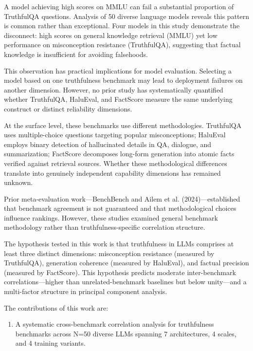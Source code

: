 
A model achieving high scores on MMLU can fail a substantial proportion of TruthfulQA questions. Analysis of 50 diverse language models reveals this pattern is common rather than exceptional. Four models in this study demonstrate the disconnect: high scores on general knowledge retrieval (MMLU) yet low performance on misconception resistance (TruthfulQA), suggesting that factual knowledge is insufficient for avoiding falsehoods.

This observation has practical implications for model evaluation. Selecting a model based on one truthfulness benchmark may lead to deployment failures on another dimension. However, no prior study has systematically quantified whether TruthfulQA, HaluEval, and FactScore measure the same underlying construct or distinct reliability dimensions.

At the surface level, these benchmarks use different methodologies. TruthfulQA uses multiple-choice questions targeting popular misconceptions; HaluEval employs binary detection of hallucinated details in QA, dialogue, and summarization; FactScore decomposes long-form generation into atomic facts verified against retrieval sources. Whether these methodological differences translate into genuinely independent capability dimensions has remained unknown.

Prior meta-evaluation work---BenchBench \citep{perlitz2024benchbench} and Ailem et al. (2024)---established that benchmark agreement is not guaranteed and that methodological choices influence rankings. However, these studies examined general benchmark methodology rather than truthfulness-specific correlation structure.

The hypothesis tested in this work is that truthfulness in LLMs comprises at least three distinct dimensions: misconception resistance (measured by TruthfulQA), generation coherence (measured by HaluEval), and factual precision (measured by FactScore). This hypothesis predicts moderate inter-benchmark correlations---higher than unrelated-benchmark baselines but below unity---and a multi-factor structure in principal component analysis.

The contributions of this work are:

\begin{enumerate}
\item A systematic cross-benchmark correlation analysis for truthfulness benchmarks across N=50 diverse LLMs spanning 7 architectures, 4 scales, and 4 training variants.
\end{enumerate}

